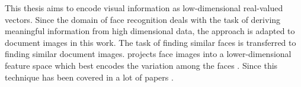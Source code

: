 This thesis aims to encode visual information as low-dimensional real-valued vectors.
Since the domain of face recognition deals with the task of deriving meaningful information from high dimensional data,
the \eigenfaces{} approach is adapted to document images in this work.
The task of finding similar faces is transferred to finding similar document images.
\eigenfaces{} projects face images into a lower-dimensional feature space which best encodes the variation among the faces \cite{eigenfaces1991}.
Since \citeyear{eigenfaces1991} this technique has been covered in a lot of papers 
\cite{eigenfaces1991, eigenfaces1997, eigenfaces2013, face-recognition2008, face-recognition2020, face-recognition2021}.